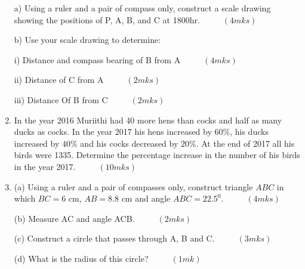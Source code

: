 \documentclass[
  a4paperpaper,
]{scrbook}
\begin{document}
\begin{tcolorbox}
\begin{enumerate}
  a) Using a ruler and a pair of compass only, construct a scale drawing
  showing the positions of P, A, B, and C at 1800hr.
  \(\hspace{1cm} (4mks)\)

  b) Use your scale drawing to determine:

  i) Distance and compass bearing of B from A \(\hspace{1cm} (4mks)\)

  ii) Distance of C from A \(\hspace{1cm} (2mks)\)

  iii) Distance Of B from C \(\hspace{1cm} (2mks)\)
\item
  In the year 2016 Muriithi had 40 more hens than cocks and half as many
  ducks as cocks. In the year 2017 his hens increased by \(60\%\), his
  ducks increased by \(40\%\) and his cocks decreased by \(20\%\). At
  the end of 2017 all his birds were 1335. Determine the percentage
  increase in the number of his birds in the year 2017.
  \(\hspace{1cm} (10mks)\)
\item
  (a) Using a ruler and a pair of compasses only, construct triangle
  \(ABC\) in which \(BC=6\) cm, \(AB=8.8\) cm and angle \(ABC=22.5^0\).
  \(\hspace{1cm}(4mks)\)

  (b) Measure AC and angle ACB. \(\hspace{1cm} (2mks)\)

  (c) Construct a circle that passes through A, B and C.
  \(\hspace{1cm}(3mks)\)

  (d) What is the radius of this circle? \(\hspace{1cm} (1mk)\)
\end{enumerate}

\end{tcolorbox}
\end{document}
